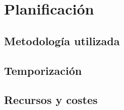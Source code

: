 \chapter{Planificación}

\section{Metodología utilizada}


\section{Temporización}

\section{Recursos y costes}
